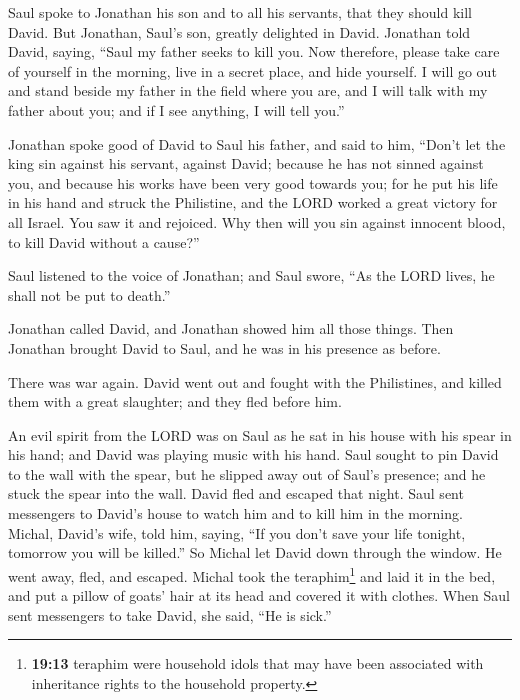  Saul spoke to Jonathan his son and to all his servants,
that they should kill David. But Jonathan, Saul's son, greatly delighted
in David.  Jonathan told David, saying, ``Saul my father
seeks to kill you. Now therefore, please take care of yourself in the
morning, live in a secret place, and hide yourself.  I
will go out and stand beside my father in the field where you are, and I
will talk with my father about you; and if I see anything, I will tell
you.''

 Jonathan spoke good of David to Saul his father, and said
to him, ``Don't let the king sin against his servant, against David;
because he has not sinned against you, and because his works have been
very good towards you;  for he put his life in his hand
and struck the Philistine, and the LORD worked a great victory for all
Israel. You saw it and rejoiced. Why then will you sin against innocent
blood, to kill David without a cause?''

 Saul listened to the voice of Jonathan; and Saul swore,
``As the LORD lives, he shall not be put to death.''

 Jonathan called David, and Jonathan showed him all those
things. Then Jonathan brought David to Saul, and he was in his presence
as before.

 There was war again. David went out and fought with the
Philistines, and killed them with a great slaughter; and they fled
before him.

 An evil spirit from the LORD was on Saul as he sat in his
house with his spear in his hand; and David was playing music with his
hand.  Saul sought to pin David to the wall with the
spear, but he slipped away out of Saul's presence; and he stuck the
spear into the wall. David fled and escaped that night. 
Saul sent messengers to David's house to watch him and to kill him in
the morning. Michal, David's wife, told him, saying, ``If you don't save
your life tonight, tomorrow you will be killed.''  So
Michal let David down through the window. He went away, fled, and
escaped.  Michal took the teraphim\footnote{\textbf{19:13}
  teraphim were household idols that may have been associated with
  inheritance rights to the household property.} and laid it in the bed,
and put a pillow of goats' hair at its head and covered it with clothes.
 When Saul sent messengers to take David, she said, ``He
is sick.''

